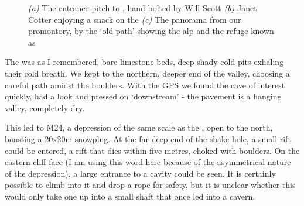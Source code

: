 \begin{figure}[t!]
\checkoddpage \ifoddpage \forcerectofloat \else \forceversofloat \fi
    \centering
    \begin{subfigure}[t]{0.59\textwidth}
        \centering
        \caption{} \label{Will Scott bolting}
    \end{subfigure}
    \hfill
    \begin{subfigure}[t]{0.393\textwidth}
        \centering
        \caption{} \label{Ice}
    \end{subfigure}

    \vspace{0.3cm}
    \begin{subfigure}[t]{\textwidth}
    \centering
        \caption{} \label{Panorama}
    \end{subfigure}
    \caption{
    \emph{(a)} The entrance pitch to \protect{}, hand bolted by Will Scott
    \emph{(b)} Janet Cotter enjoying a snack on the \protect{}
    \emph{(c)} The panorama from our promontory, by the `old \protect{} path' showing the \protect{} alp and the refuge known as \protect{} }
\end{figure}


The  was as I remembered, bare limestone beds, deep shady cold pits exhaling their cold breath. We kept to the northern, deeper end of the valley, choosing a careful path amidst the boulders. With the GPS we found the cave of interest quickly, had a look and pressed on `downstream' - the pavement is a hanging valley, completely dry. 

This led to M24, a depression of the same scale as the , open to the north, boasting a 20x20m snowplug. At the far deep end of the shake hole, a small rift could be entered, a rift that dies within five metres, choked with boulders. On the eastern cliff face  (I am using this word here because of the asymmetrical nature of the depression), a large entrance to a cavity could be seen. It is certainly possible to climb into it and drop a rope for safety, but it is unclear whether this would only take one up into a small shaft that once led into a cavern. 


